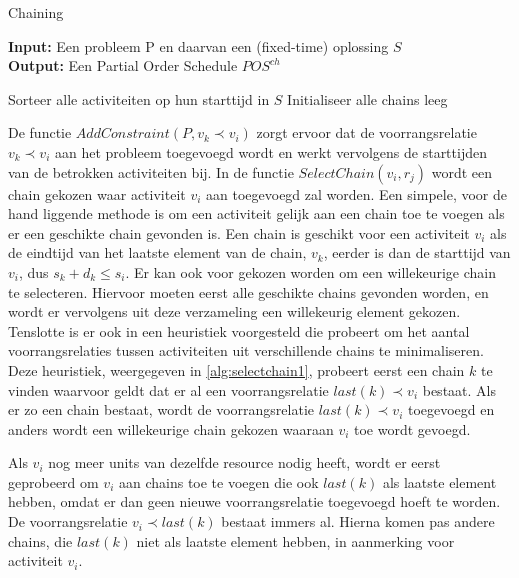 \begin{algorithm}
\caption{Chaining \cite{policella2007precedence}}
\label{alg:chaining}
\textbf{Input:} Een probleem P en daarvan een (fixed-time) oplossing $S$ \\
\textbf{Output:} Een Partial Order Schedule $POS^{ch}$
\begin{algorithmic}[1]
    \State Sorteer alle activiteiten op hun starttijd in $S$  
    \State Initialiseer alle chains leeg
        \EndFor
      \EndFor
    \EndFor
  \EndFunction
\end{algorithmic}
\end{algorithm}

De functie $AddConstraint(P,v_k \prec v_i)$ zorgt ervoor dat de voorrangsrelatie $v_k \prec v_i$ aan het probleem toegevoegd wordt en werkt vervolgens de starttijden van de betrokken activiteiten bij. In de functie $SelectChain(v_i,r_j)$ wordt een chain gekozen waar activiteit $v_i$ aan toegevoegd zal worden. Een simpele, voor de hand liggende methode is om een activiteit gelijk aan een chain toe te voegen als er een geschikte chain gevonden is. Een chain is geschikt voor een activiteit $v_i$ als de eindtijd van het laatste element van de chain, $v_k$, eerder is dan de starttijd van $v_i$, dus $s_k + d_k \leq s_i$. Er kan ook voor gekozen worden om een willekeurige chain te selecteren. Hiervoor moeten eerst alle geschikte chains gevonden worden, en wordt er vervolgens uit deze verzameling een willekeurig element gekozen. Tenslotte is er ook in \cite{policella2004generating} een heuristiek voorgesteld die probeert om het aantal voorrangsrelaties tussen activiteiten uit verschillende chains te minimaliseren. Deze heuristiek, weergegeven in \ref{alg:selectchain1}, probeert eerst een chain $k$ te vinden waarvoor geldt dat er al een voorrangsrelatie $last(k) \prec v_i$ bestaat. Als er zo een chain bestaat, wordt de voorrangsrelatie $last(k) \prec v_i$ toegevoegd en anders wordt een willekeurige chain gekozen waaraan $v_i$ toe wordt gevoegd.

Als $v_i$ nog meer units van dezelfde resource nodig heeft, wordt er eerst geprobeerd om $v_i$ aan chains toe te voegen die ook $last(k)$ als laatste element hebben, omdat er dan geen nieuwe voorrangsrelatie toegevoegd hoeft te worden. De voorrangsrelatie $v_i \prec last(k)$ bestaat immers al. Hierna komen pas andere chains, die $last(k)$ niet als laatste element hebben, in aanmerking voor activiteit $v_i$.

